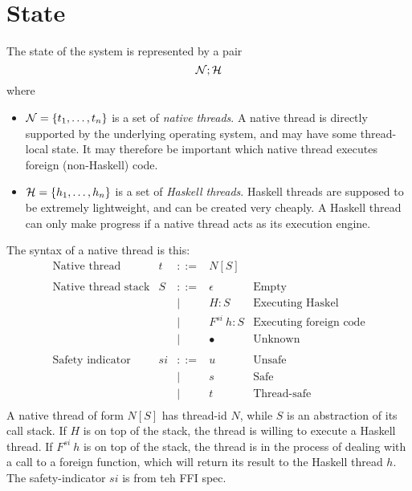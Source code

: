 \documentclass{article}
\newcommand{\NS}{{\cal N}}
\newcommand{\HS}{{\cal H}}
\newcommand{\hcall}{H}
\newcommand{\fcall}[2]{F^{#1}~#2}
\begin{document}
\section{State}

The state of the system is represented by a pair
$$\NS ; \HS$$
where 
\begin{itemize}
\item $\NS = \{t_1, \ldots ,t_n\}$ is a set of \emph{native threads}.
A native thread is directly supported by the underlying operating
system, and may have some thread-local state. It may therefore
be important which native thread executes foreign
(non-Haskell) code.

\item $\HS = \{h_1, \ldots ,h_n\}$ is a set of \emph{Haskell threads}.
Haskell threads are supposed to be extremely lightweight, and
can be created very cheaply. A Haskell thread can only make progress
if a native thread acts as its execution engine.
\end{itemize}

The syntax of a native thread is this:
$$
\begin{array}{lrcll}
\mbox{Native thread} &  t & ::= & N[S] \\
\\
\mbox{Native thread stack} &  S & ::= & \epsilon & \mbox{Empty}\\
	& & | & \hcall : S  & \mbox{Executing Haskel} \\
	& & | & \fcall{si}{h} : S & \mbox{Executing foreign code}\\
	& & | & \bullet & \mbox{Unknown}\\
\\
\mbox{Safety indicator} &  si & ::= & u & \mbox{Unsafe} \\
	& & | & s & \mbox{Safe} \\
	& & | & t & \mbox{Thread-safe} \\
\end{array}
$$
A native thread of form $N[S]$ has thread-id $N$, while $S$ is
an abstraction of its call stack.  If $\hcall$ is on top of the stack,
the thread is willing to execute a Haskell thread.  If $\fcall{si}{h}$ is
on top of the stack, the thread is in the process of dealing with a call
to a foreign function, which will return its result to the Haskell thread
$h$.  The safety-indicator $si$ is from teh FFI spec.
\end{document}
